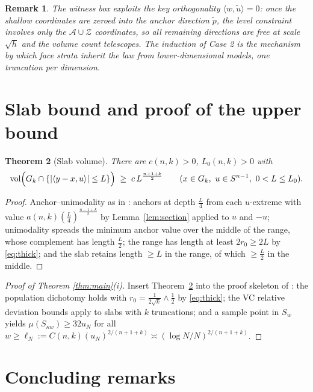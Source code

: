 ﻿\documentclass[11pt]{article}
\newtheorem{theorem}{Theorem}[section]
\newtheorem{remark}[theorem]{Remark}
\newcommand{\vol}{\operatorname{vol}}
\begin{document}
\begin{remark}
The witness box exploits the key orthogonality $\langle w,\tilde u\rangle=0$:
once the shallow coordinates are zeroed into the anchor direction
$\tilde p$, the level constraint involves only the $\mathcal A\cup\mathcal
Z$ coordinates, so all remaining directions are free at scale $\sqrt h$ and
the volume count telescopes.  The induction of Case 2 is the mechanism by
which face strata inherit the law from lower-dimensional models, one
truncation per dimension.
\end{remark}

\section{Slab bound and proof of the upper bound}\label{sec:upper}

\begin{theorem}[Slab volume]\label{thm:slab}
There are $c(n,k)>0$, $L_0(n,k)>0$ with
\[
\vol\Bigl(G_k\cap\{|\langle y-x,u\rangle|\le L\}\Bigr)
\;\ge\;c\,L^{\frac{n+1+k}2}
\qquad(x\in G_k,\ u\in S^{n-1},\ 0<L\le L_0).
\]
\end{theorem}

\begin{proof}
Anchor--unimodality as in \cite{companion3,companion7}: anchors at depth
$\frac L4$ from each $u$-extreme with value
$a(n,k)(\frac L4)^{\frac{n-1+k}2}$ by Lemma~\ref{lem:section} applied to
$u$ and $-u$; unimodality spreads the minimum anchor value over the middle
of the range, whose complement has length $\frac L2$; the range has length at
least $2r_0\ge2L$ by \eqref{eq:thick}; and the slab retains length
$\ge L$ in the range, of which $\ge\frac L2$ in the middle.
\end{proof}

\begin{proof}[Proof of Theorem \ref{thm:main}(i)]
Insert Theorem~\ref{thm:slab} into the proof skeleton of
\cite{companion2,companion3}: the population dichotomy holds with
$r_0=\frac1{2\sqrt k}\wedge\frac12$ by \eqref{eq:thick}; the VC relative
deviation bounds apply to slabs with $k$ truncations; and a sample point in
$S_w$ yields $\mu(S_{\kappa w})\ge32u_N$ for all
$w\ge\ell_N:=C(n,k)(u_N)^{2/(n+1+k)}\asymp(\log N/N)^{2/(n+1+k)}$.
\end{proof}

\section{Concluding remarks}\label{sec:concl}
\end{document}
